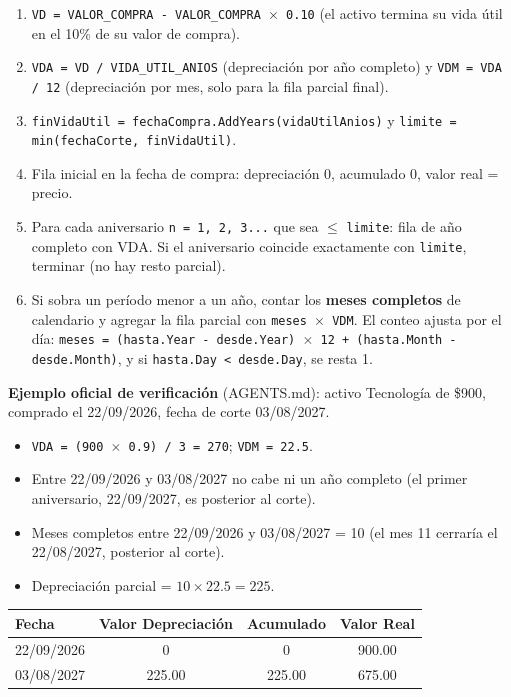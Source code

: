 \documentclass[11pt,a4paper]{article}
\begin{document}
\begin{enumerate}
    \item \texttt{VD = VALOR\_COMPRA - VALOR\_COMPRA $\times$ 0.10} (el activo
    termina su vida útil en el 10\% de su valor de compra).
    \item \texttt{VDA = VD / VIDA\_UTIL\_ANIOS} (depreciación por año
    completo) y \texttt{VDM = VDA / 12} (depreciación por mes, solo para la
    fila parcial final).
    \item \texttt{finVidaUtil = fechaCompra.AddYears(vidaUtilAnios)} y
    \texttt{limite = min(fechaCorte, finVidaUtil)}.
    \item Fila inicial en la fecha de compra: depreciación 0, acumulado 0,
    valor real = precio.
    \item Para cada aniversario \texttt{n = 1, 2, 3...} que sea
    $\le$ \texttt{limite}: fila de año completo con VDA. Si el aniversario
    coincide exactamente con \texttt{limite}, terminar (no hay resto parcial).
    \item Si sobra un período menor a un año, contar los \textbf{meses
    completos} de calendario y agregar la fila parcial con
    \texttt{meses $\times$ VDM}. El conteo ajusta por el día:
    \texttt{meses = (hasta.Year - desde.Year) $\times$ 12 + (hasta.Month - desde.Month)},
    y si \texttt{hasta.Day < desde.Day}, se resta 1.
\end{enumerate}

\textbf{Ejemplo oficial de verificación} (AGENTS.md): activo Tecnología de
\$900, comprado el 22/09/2026, fecha de corte 03/08/2027.

\begin{itemize}
    \item \texttt{VDA = (900 $\times$ 0.9) / 3 = 270}; \texttt{VDM = 22.5}.
    \item Entre 22/09/2026 y 03/08/2027 no cabe ni un año completo (el primer
    aniversario, 22/09/2027, es posterior al corte).
    \item Meses completos entre 22/09/2026 y 03/08/2027 = 10 (el mes 11
    cerraría el 22/08/2027, posterior al corte).
    \item Depreciación parcial = $10 \times 22.5 = 225$.
\end{itemize}

\begin{center}
\begin{tabular}{|l|c|c|c|}
\hline
\textbf{Fecha} & \textbf{Valor Depreciación} & \textbf{Acumulado} & \textbf{Valor Real} \\
\hline
22/09/2026 & 0 & 0 & 900.00 \\
\hline
03/08/2027 & 225.00 & 225.00 & 675.00 \\
\hline
\end{tabular}
\end{center}
\end{document}

